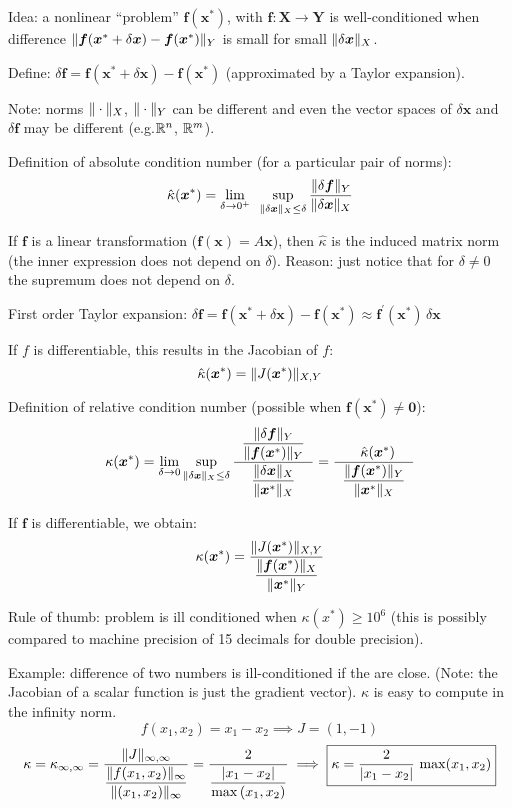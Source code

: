 \documentclass[
  12pt,
  paper=a4,
]{scrartcl} %
\begin{document}
\newpage


Idea: a nonlinear ``problem'' $\bm f(\bm x^*)$, with $\bm f:\bm X\to \bm Y$ is well-conditioned when difference $\|\bm f(\bm x^*+\delta \bm x)-\bm f(\bm x^*)\|_Y$ is small for small $\|\delta \bm x\|_X$.

Define: $\delta \bm f = \bm f(\bm x^*+\delta \bm x)-\bm f(\bm x^*)$ (approximated by a Taylor expansion).

Note: norms $\|\cdot\|_X$, $\|\cdot\|_Y$ can be different and even the vector spaces of $\delta \bm x$ and $\delta\bm f$ may be different (e.g.\@ $\mathbb R^n$, $\mathbb R^m$).

Definition of absolute condition number (for a particular pair of norms):
\[
\hat{\kappa}(\bm x^*)
=
\lim_{\delta\to 0^+}\,\,\,
\sup_{\|\delta\bm x\|_X\le\delta}
\frac{
\|\delta \bm f\|_Y
}{
\|\delta \bm x\|_X
}
\]

If $\bm f$ is a linear transformation ($\bm f(\bm x) = A\bm x$), then $\hat{\kappa}$ is the induced matrix norm (the inner expression does not depend on $\delta$). Reason: just notice that for $\delta\neq 0$ the supremum does not depend on $\delta$.

First order Taylor expansion: $
\delta \bm f = \bm f(\bm x^*+\delta \bm x)-\bm f(\bm x^*)
\approx \bm f^\prime(\bm x^*)\, \delta \bm x
$

If $f$ is differentiable, this results in the Jacobian of $f$:
\[
\hat{\kappa}(\bm x^*)
=
\|J(\bm x^*)\|_{X,Y}
\]

Definition of relative condition number (possible when $\bm f(\bm x^*)\neq \bm 0$):
\[
\kappa(\bm x^*)
=\lim_{\delta\to 0}
\sup_{\|\delta \bm x\|_X \le \delta}
\frac{\phantom{..}
\displaystyle
    \frac{\|\delta \bm f\|_Y}{\|\bm f(\bm x^*)\|_Y}
\phantom{..}
}{\phantom{..}
\displaystyle
    \frac{\|\delta \bm x\|_X}{\|\bm x^*\|_X}
\phantom{..}
}
=
\frac{\phantom{..}
    \hat\kappa(\bm x^*)
}{\phantom{..}
\displaystyle
    \frac{\|\bm f(\bm x^*)\|_Y}{\|\bm x^*\|_X}
\phantom{..}
}
\]

If $\bm f$ is differentiable, we obtain:
\[
{\kappa}(\bm x^*)
=
\frac{
    \|J(\bm x^*)\|_{X,Y}
}{\displaystyle
\frac{\|\bm f(\bm x^*)\|_X}{\|\bm x^*\|_Y}}
\]

Rule of thumb: problem is ill conditioned when ${\kappa}(x^*) \ge 10^6$ (this is possibly compared to machine precision of 15 decimals for double precision).

Example: difference of two numbers is ill-conditioned if the are close. (Note: the Jacobian of a scalar function is just the gradient vector). $\kappa$ is easy to compute in the infinity norm.
\[f(x_1, x_2) = x_1 - x_2 \implies J = \left(
1, -1
\right) \]
\[
\kappa = \kappa_{\infty,\infty}
=
\frac{
    \|J\|_{\infty,\infty}
}{\displaystyle
\frac{\|f(x_1, x_2)\|_\infty}{\|(x_1, x_2)\|_\infty}}
=
\frac{
    2
}{\displaystyle
\frac{|x_1 - x_2|}{\max{(x_1, x_2)}}}
\implies
\boxed{
    \kappa = \frac{2}{|x_1 - x_2|}\,\max(x_1, x_2)
}
\]
\end{document}
